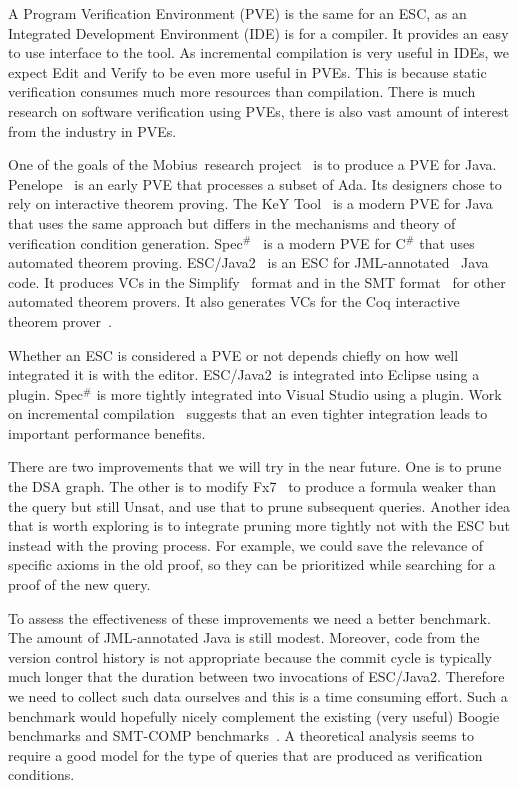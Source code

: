 \documentclass{llncs}
\def\mobius{{\sc Mobius}}
\def\unsat{{\sc Unsat}}
\def\escjava{\hskip 0pt\hbox{ESC/Java2}}
\begin{document}
A Program Verification Environment (PVE) is the same for an ESC,
as an Integrated Development Environment (IDE) is for a compiler.
It provides an easy to use interface to the tool. As incremental
compilation is very useful in IDEs, we expect Edit and Verify
to be even more useful in PVEs. This is because static verification
consumes much more resources than compilation. There is
much research on software verification using PVEs, there is also
vast amount of interest from the industry in PVEs.

One of the goals of the \mobius\ research project~\cite{mobius}
is to produce a PVE for Java. Penelope~\cite{guaspari1990fva} is an early PVE that
processes a subset of Ada. Its designers chose to rely
on interactive theorem proving. The KeY Tool~\cite{KeyBook2007}
is a modern PVE for Java that uses the same approach but differs
in the mechanisms and theory of verification condition generation.
Spec$^\#$~\cite{boogie} is a modern PVE for C$^\#$ that uses automated
theorem proving.  \escjava~\cite{escjava,cok2005eju} is an ESC for
JML-annotated~\cite{leavens1999jnd} Java code.  It produces VCs in the
Simplify~\cite{simplify} format and in the SMT format~\cite{smtlib}
for other automated theorem provers. It also generates VCs for the Coq
interactive theorem prover~\cite{coq}.

Whether an ESC is considered a PVE or not depends chiefly
on how well integrated it is with the editor. \escjava\
is integrated into Eclipse using a plugin. Spec$^\#$ is
more tightly integrated into Visual Studio using a plugin.
Work on incremental compilation~\cite{schwartz1984icm}
suggests that an even tighter integration leads to important
performance benefits.

There are two improvements that we will try in the near 
future. One is to prune the DSA graph. The other is
to modify Fx7~\cite{fx7} to produce a formula weaker
than the query but still \unsat, and use that to prune
subsequent queries. Another idea that is worth exploring
is to integrate pruning more tightly not with the ESC but 
instead with the proving process. For example, we could
save the relevance of specific axioms in the old proof,
so they can be prioritized while searching for a proof 
of the new query.

To assess the effectiveness of these improvements we need
a better benchmark. The amount of JML-annotated
Java is still modest. Moreover, code from the version 
control history is not appropriate because the commit 
cycle is typically much longer that the duration between 
two invocations of \escjava. Therefore we need to collect 
such data ourselves and this is a time consuming effort. 
Such a benchmark would hopefully nicely complement the 
existing (very useful) Boogie benchmarks and SMT-COMP 
benchmarks~\cite{smtlib}. A theoretical analysis seems
to require a good model for the type of queries that
are produced as verification conditions.
\end{document}
